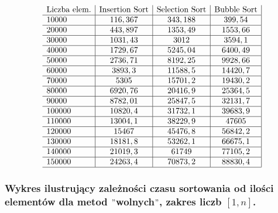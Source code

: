 \documentclass[polish,polish,a4paper]{article}
\begin{document}
\begin{spacing}{1.5}
\begin{figure}[H]
\begin{equation*}
\begin{array}{l|c|c|c|}
		$Liczba elem.$&$Insertion Sort$&$Selection Sort$&$Bubble Sort$\\\hline
		10000&	116,367&	343,188&	399,54\\\hline
		20000&	443,897&	1353,49&	1553,66\\\hline
		30000&	1031,43&	3012&	3594,1\\\hline
		40000&	1729,67&	5245,04&	6400,49\\\hline
		50000&	2736,71&	8192,25&	9928,66\\\hline
		60000&	3893,3&	11588,5&	14420,7\\\hline
		70000&	5305&	15701,2&	19430,2\\\hline
		80000&	6920,76&	20416,9&	25364,5\\\hline
		90000&	8782,01&	25847,5&	32131,7\\\hline
		100000&	10820,4&	31732,1&	39683,9\\\hline
		110000&	13004,1&	38229,9&	47605\\\hline
		120000&	15467&	45476,8&	56842,2\\\hline
		130000&	18181,8&	53262,1&	66675,1\\\hline
		140000&	21019,3&	61749&	77105,2\\\hline
		150000&	24263,4&	70873,2&	88830,4\\
		\hline
		\end{array}
		\end{equation*}
	\end{figure}
	
	\subsubsection*{Wykres ilustrujący zależności czasu sortowania od ilości elementów dla metod $"$wolnych$"$, zakres liczb $ [1,n] $.}
	

\end{spacing}
\end{document}

